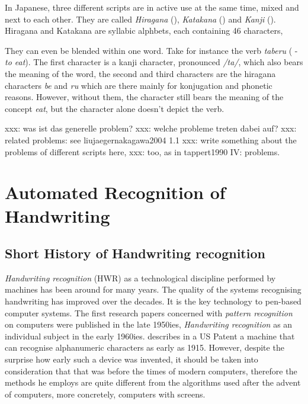 In Japanese, three different scripts are in active use at the same time,
mixed and next to each other. They are called \emph{Hiragana} (), 
\emph{Katakana} () and \emph{Kanji} ().
Hiragana and Katakana are syllabic alphbets, each containing 46 characters,


They can even be blended within one word. Take for instance the verb 
\emph{taberu} ( - \emph{to eat}). The first character is a kanji 
character, pronounced \emph{/ta/}, which also bears the meaning of the
word, the second and third characters are the hiragana characters 
\emph{be} and \emph{ru} which are there mainly for konjugation and 
phonetic reasons. However, without them, the character  still bears
the meaning of the concept \emph{eat}, but the character alone doesn't depict 
the verb.


xxx: was ist das generelle problem?
xxx: welche probleme treten dabei auf?
xxx: related problems: see liujaegernakagawa2004 1.1
xxx: write something about the problems of different scripts here, 
xxx: too, as in tappert1990 IV: problems.


\section{Automated Recognition of Handwriting}
\label{sec:autorecoofhandwriting}

\subsection{Short History of Handwriting recognition}
\label{sec:shorthistoryofhwr}

\emph{Handwriting recognition} (HWR) as a technological discipline performed 
by machines has been around for many years. The quality of the systems 
recognising handwriting has improved over the decades. It is the key 
technology to pen-based computer systems. The first research papers 
concerned with \emph{pattern recognition} on computers were published 
in the late 1950ies, \emph{Handwriting recognition} as an individual subject in 
the early 1960ies.  describes in a US Patent
a machine that can recognise alphanumeric characters as early as 1915. 
However, despite the surprise how early such a device was invented,
it should be taken into consideration that that was before the times 
of modern computers, therefore the methods he employs are quite different 
from the algorithms used after the advent of computers, more concretely, 
computers with screens. 

